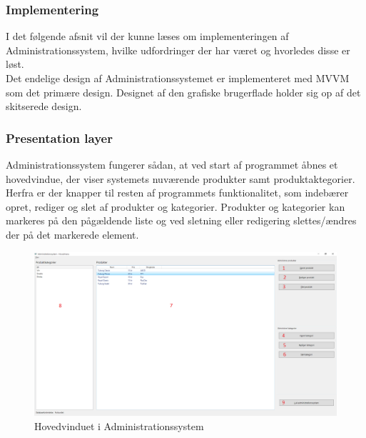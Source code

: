 \subsubsection{Implementering}
I det følgende afsnit vil der kunne læses om implementeringen af Administrationssystem, hvilke udfordringer der har været og hvorledes disse er løst.\\
Det endelige design af Administrationssystemet er implementeret med MVVM som det primære design. Designet af den grafiske brugerflade holder sig op af det skitserede design.\\


\subsubsection{Presentation layer}
Administrationssystem fungerer sådan, at ved start af programmet åbnes et hovedvindue, der viser systemets nuværende produkter samt produktaktegorier. Herfra er der knapper til resten af programmets funktionalitet, som indebærer opret, rediger og slet af produkter og kategorier. Produkter og kategorier kan markeres på den pågældende liste og ved sletning eller redigering slettes/ændres der på det markerede element.\\

\begin{figure}[H]
	\centering
	\includegraphics[width=\textwidth]{Projektbeskrivelse/DesignOgImplementering/Images/BackendDemo}
	\caption{Hovedvinduet i Administrationssystem}
	\label{fig:admindemo}
\end{figure}

